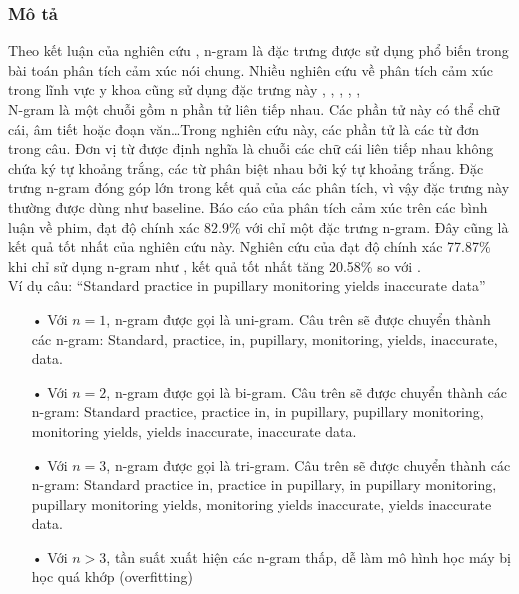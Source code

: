 \subsubsection*{Mô tả}
Theo kết luận của nghiên cứu \cite{chandrakala2012opinion}, n-gram là đặc trưng được sử dụng phổ biến trong bài toán phân tích cảm xúc nói chung. Nhiều nghiên cứu về phân tích cảm xúc trong lĩnh vực y khoa cũng sử dụng đặc trưng này \cite{pang2002thumbs}, \cite{niu2005analysis}, \cite{sarker2011outcome}, \cite{niu2006using}, \cite{pestian2012sentie}, \cite{xia09improving} \\

N-gram là một chuỗi gồm n phần tử liên tiếp nhau. Các phần tử này có thể chữ cái, âm tiết hoặc đoạn văn\ldots Trong nghiên cứu này, các phần tử là các từ đơn trong câu. Đơn vị từ được định nghĩa là chuỗi các chữ cái liên tiếp nhau không chứa ký tự khoảng trắng, các từ phân biệt nhau bởi ký tự khoảng trắng. Đặc trưng n-gram đóng góp lớn trong kết quả của các phân tích, vì vậy đặc trưng này thường được dùng như baseline. Báo cáo  của \cite{pang2002thumbs} phân tích cảm xúc trên các bình luận về phim, đạt độ chính xác 82.9\% với chỉ một đặc trưng n-gram. Đây cũng là kết quả tốt nhất của nghiên cứu này. Nghiên cứu của \cite{niu2005analysis} đạt độ chính xác 77.87\% khi chỉ sử dụng n-gram như , kết quả tốt nhất tăng 20.58\% so với . \\

Ví dụ câu: ``Standard practice in pupillary monitoring yields inaccurate data''
\begin{itemize}
\item[•]Với $n=1$, n-gram được gọi là uni-gram. Câu trên sẽ được chuyển thành các n-gram: Standard, practice, in, pupillary, monitoring, yields, inaccurate, data.
\item[•]Với $n=2$, n-gram được gọi là bi-gram. Câu trên sẽ được chuyển thành các n-gram: Standard practice, practice in, in pupillary, pupillary monitoring, monitoring yields, yields inaccurate, inaccurate data.
\item[•]Với $n=3$, n-gram được gọi là tri-gram. Câu trên sẽ được chuyển thành các n-gram: Standard practice in, practice in pupillary, in pupillary monitoring, pupillary monitoring yields, monitoring yields inaccurate, yields inaccurate data.
\item[•]Với $n>3$, tần suất xuất hiện các n-gram thấp, dễ làm mô hình học máy bị học quá khớp (overfitting)
\end{itemize}

